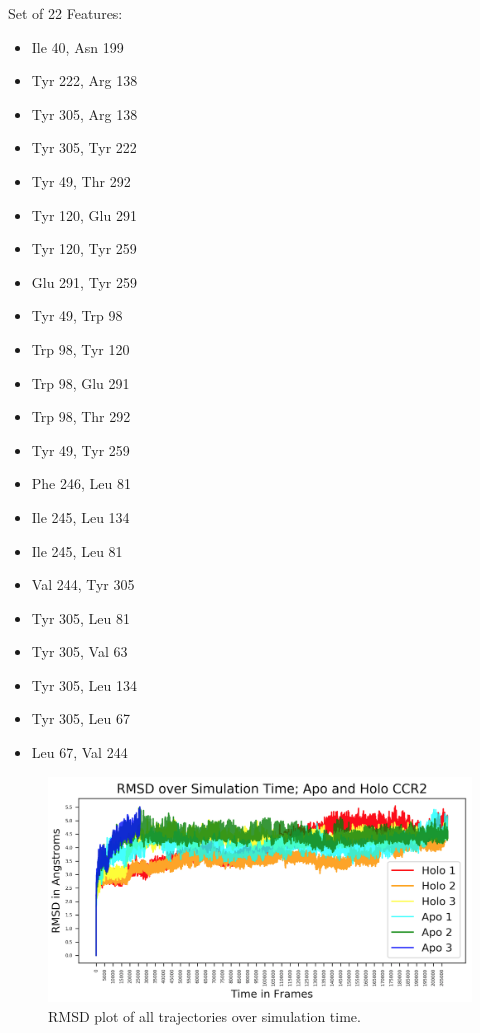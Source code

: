 \documentclass[9pt,twoside]{pnas-new}
\begin{document}
Set of 22 Features:
\begin{itemize}
\item{Ile 40, Asn 199}
\item{Tyr 222, Arg 138}
\item{Tyr 305, Arg 138}
\item{Tyr 305, Tyr 222}
\item{Tyr 49, Thr 292}
\item{Tyr 120, Glu 291}
\item{Tyr 120, Tyr 259}
\item{Glu 291, Tyr 259}
\item{Tyr 49, Trp 98}
\item{Trp 98, Tyr 120}
\item{Trp 98, Glu 291}
\item{Trp 98, Thr 292}
\item{Tyr 49, Tyr 259}
\item{Phe 246, Leu 81}
\item{Ile 245, Leu 134}
\item{Ile 245, Leu 81}
\item{Val 244, Tyr 305}
\item{Tyr 305, Leu 81}
\item{Tyr 305, Val 63}
\item{Tyr 305, Leu 134}
\item{Tyr 305, Leu 67}
\item{Leu 67, Val 244}
\end{itemize}



\begin{figure}
\centering
\includegraphics[width=\textwidth]{./figures/rmsd.png}
\caption{RMSD plot of all trajectories over simulation time.}
\label{fig:rmsd}
\end{figure}
\end{document}
